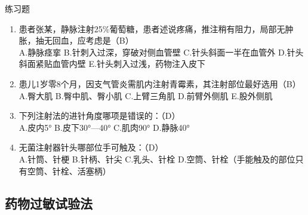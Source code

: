 \documentclass[11pt, a4paper]{ctexart}
\begin{document}
\begin{examplebox}{练习题}
\begin{enumerate}
    \item 患者张某，静脉注射25\%葡萄糖，患者述说疼痛，推注稍有阻力，局部无肿胀，抽无回血，应考虑是（B）\\
    A.静脉痉挛 \quad B.针刺入过深，穿破对侧血管壁 \quad C.针头斜面一半在血管外 \quad D.针头斜面紧贴血管内壁 \quad E.针头刺入过浅，药物注入皮下
    \item 患儿1岁零8个月，因支气管炎需肌内注射青霉素，其注射部位最好选用（B）\\
    A.臀大肌 \quad B.臀中肌、臀小肌 \quad C.上臂三角肌 \quad D.前臂外侧肌 \quad E.股外侧肌
    \item 下列注射法的进针角度哪项是错误的：（D）\\
    A.皮内5° \quad B.皮下30°—40° \quad C.肌肉90° \quad D.静脉40°
    \item 无菌注射器针头哪部位手可触及：（D）\\
    A.针筒、针梗 \quad B.针柄、针尖 \quad C.乳头、针栓 \quad D.空筒、针栓（手能触及的部位只有空筒、针栓、活塞柄）
\end{enumerate}
\end{examplebox}

\subsection{药物过敏试验法}
\end{document}
